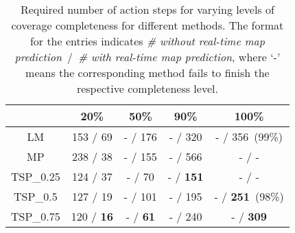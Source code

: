 \begin{table}\vspace{2pt}%
\caption{\small Required number of action steps for varying levels of coverage completeness for different methods. The format for the entries indicates \textit{\# without real-time map prediction}~/~\textit{\# with real-time map prediction}, where `-' means the corresponding method fails to finish the respective completeness level.} %
\centering %
{%
\begin{tabularx}{0.85\linewidth}{ccccc}%
\hline\hline %
   & 20\% & 50\%  & 90\% & 100\% \\[0.5ex]
\hline %
LM  & 153 / 69 & - / 176 & - / 320 &  - / 356~(99\%)\\ [1ex]%
MP & 238 / 38 & - / 155 & - / 566 & - / -\\ [1ex]%
TSP\_0.25  & 124 / 37 & - / 70 & - / \textbf{151} & - / - \\ [1ex]
TSP\_0.5  & 127 / 19 & - / 101 & - / 195 & - / \textbf{251}~(98\%)\\ [1ex]
TSP\_0.75  & 120  / \textbf{16} & - / \textbf{61} &- / 240 & - / \textbf{309} \\
\hline %
\end{tabularx}
}
\label{tb:coverage_comparison} \vspace{-10pt}
\end{table}








